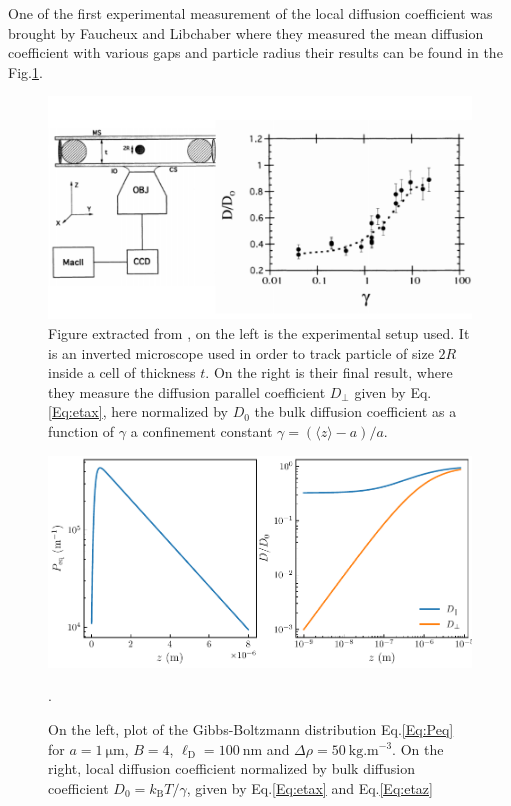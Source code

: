 One of the first experimental measurement of the local diffusion coefficient was brought by Faucheux and Libchaber \cite{faucheux_confined_1994} where they measured the mean diffusion coefficient with various gaps and particle radius their results can be found in the Fig.\ref{fig:libchaber}.

\begin{figure}
	\centering
	\includegraphics{02_body/chapter1/image/libchaber.pdf}
	\caption{Figure extracted from \cite{faucheux_confined_1994}, on the left is the experimental setup used. It is an inverted microscope used in order to track particle of size $2R$ inside a cell of thickness $t$. On the right is their final result, where they measure the diffusion parallel coefficient $D_\bot$ given by Eq.\ref{Eq:etax}, here normalized by $D_0$ the bulk diffusion coefficient as a function of  $\gamma$ a confinement constant $\gamma = (\langle z \rangle -a)/a$. }
	\label{fig:libchaber}
\end{figure}



\begin{figure}[ht]
	\centering
	\includegraphics{02_body/chapter1/image/theorie_chap1.pdf}
	\caption{On the left, plot of the Gibbs-Boltzmann distribution Eq.\ref{Eq:Peq} for $a = 1 ~ \mathrm{\mu m}$, $ B = 4 $, $\ell _\mathrm{D} = 100 ~ \mathrm{nm}$ and $\Delta \rho = 50 ~ \mathrm{kg.m^{-3}}$. On the right, local diffusion coefficient normalized by bulk diffusion coefficient $D_0 = k_\mathrm{B}T/\gamma$, given by Eq.\ref{Eq:etax} and Eq.\ref{Eq:etaz}}.
\end{figure}








